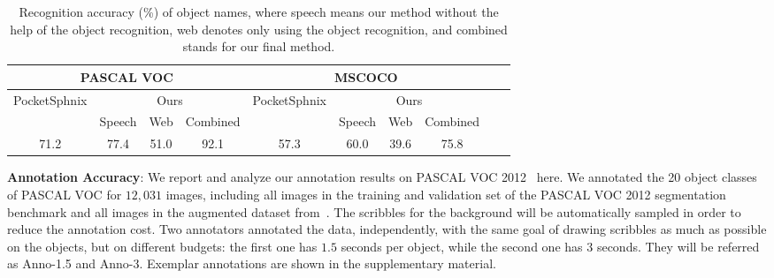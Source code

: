 \begin{table}[tb]
  \centering
  \setlength\tabcolsep{1mm}
\begin{tabular}{|c|c|c|c|c|c|c|c|c|c|  }
 \hline
 \multicolumn{4}{|c|}{PASCAL VOC} &  \multicolumn{4}{c|}{MSCOCO} \\
 \hline
 \multirow{2}{*}{PocketSphnix} &  \multicolumn{3}{c|}{Ours} &  \multirow{2}{*}{PocketSphnix} &  \multicolumn{3}{c|}{Ours} \\ 
 \cline{2-4}    \cline{6-8} 
        &   Speech  & Web &  Combined  &   &   Speech  & Web &  Combined  \\                 
 \hline
   71.2 &  77.4   & 51.0 & 92.1 & 57.3 & 60.0 & 39.6 & 75.8\\
 \hline
\end{tabular}        
\caption{Recognition accuracy (\%) of object names, where speech means our method without the help of the object recognition, web denotes only using the object recognition, and combined stands for our final method.}
 \label{table:class:eval}  
\end{table}

\textbf{Annotation Accuracy}: 
We report and analyze our annotation results on PASCAL VOC 2012~\citep{pascal:2011} here. 
We annotated the 20 object classes of PASCAL VOC for $12,031$ images, including all images in the training and validation set of the PASCAL
VOC 2012 segmentation benchmark and all images in the augmented
dataset from~\citep{semantic:contour}. The scribbles for the background will be automatically sampled in order to reduce the annotation cost. 
Two annotators annotated the data, independently, with the same goal of drawing scribbles as much as possible on the objects, but on different
budgets: the first one has $1.5$ seconds per object, while the second
one has $3$ seconds. They will be referred as Anno-1.5 and
Anno-3. Exemplar annotations are shown in the
supplementary material.

